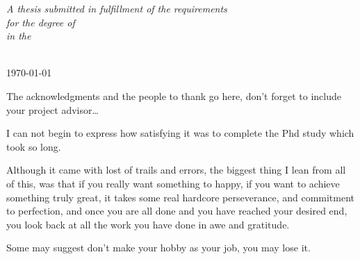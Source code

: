 \documentclass[
11pt, %
english, %
singlespacing, %
toctotoc, %
headsepline, %
]{MastersDoctoralThesis} %
\begin{document}
\begin{titlepage}
\begin{center}
\vfill

\large \textit{A thesis submitted in fulfillment of the requirements\\ for the degree of \degreename}\\[0.3cm] %
\textit{in the}\\[0.4cm]
\deptname\\[2cm] %
 
\vfill

{\large \today}\\[4cm] %
 
\vfill
\end{center}
\end{titlepage}

%


\begin{acknowledgements}
\addchaptertocentry{\acknowledgementname} %
The acknowledgments and the people to thank go here, don't forget to include your project advisor\ldots

I can not begin to express how satisfying it was to complete the Phd study which took so long.

Although it came with lost of trails and errors, the biggest thing I lean from all of this, was that if you really want something to happy, if you want to achieve something truly great, it takes some real hardcore perseverance, and commitment to perfection, and once you are all done and you have reached your desired end, you look back at all
the work you have done in awe and gratitude.

Some may suggest don't make your hobby as your job, you may lose it.

\end{acknowledgements}

\clearpage
\vspace*{0.2\textheight}
\end{document}
